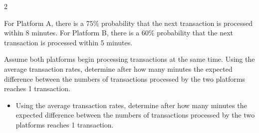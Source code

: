 \begin{multicols}{2}
{			For Platform A, there is a \(75\%\) probability that the next
			transaction is processed within 8 minutes. For Platform B, there is a
			\(60\%\) probability that the next transaction is processed within
			5 minutes.
			
			Assume both platforms begin processing transactions at the same time.
			Using the average transaction rates, determine after how many minutes
			the expected difference between the numbers of transactions processed
			by the two platforms reaches 1 transaction.
			
			\begin{itemize}
				\item[\textbf{(C4)}] Using the average transaction rates, determine after how many minutes
				the expected difference between the numbers of transactions processed
				by the two platforms reaches 1 transaction.
			\end{itemize}
			}
		
	\end{multicols}
	
